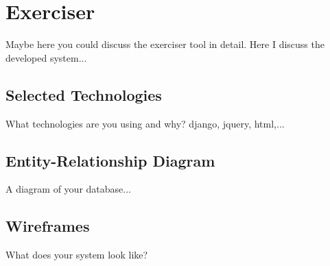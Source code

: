 \chapter{Exerciser}
\label{chap:exerciser}
\onehalfspacing
	
Maybe here you could discuss the exerciser tool in detail. Here I discuss the developed system...

\section{Selected Technologies}
What technologies are you using and why? django, jquery, html,...

\section{Entity-Relationship Diagram}
A diagram of your database...

\section{Wireframes}
What does your system look like?